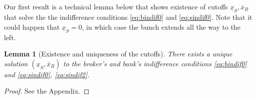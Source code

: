 \documentclass[11pt,twopage]{article}
\newcommand{\ol}{\overline}
\newcommand{\ul}{\underline}
\newtheorem{lemma}{Lemma}
{\bf}{\it}
\begin{document}
Our first result is a technical lemma below that shows existence of cutoffs $\underline x_S, \ol x_B$ that solve the the indifference conditions \eqref{eq:bindif0} and \eqref{eq:sindif0}. Note that it could happen that $\ul x_S = 0$, in which case the bunch extends all the way to the left.
\begin{lemma}[Existence and uniqueness of the cutoffs]\label{lm:cutoffs}
There exists a unique solution $(\underline x_S, \ol x_B)$ to the broker's and bank's indifference conditions \eqref{eq:bindif0} and \eqref{eq:sindif0}, \eqref{eq:sindif2}. 
\end{lemma}
\begin{proof}See the Appendix.\end{proof}
\end{document}
